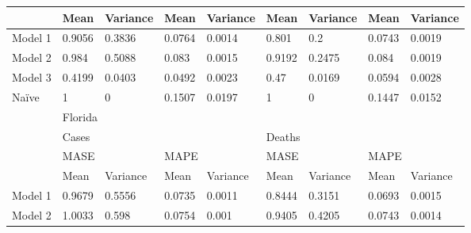 \begin{table}[h]
\begin{tabular}{|l|llll|llll|}
\cline{2-9}
        & \multicolumn{1}{l|}{Mean} & \multicolumn{1}{l|}{Variance} & \multicolumn{1}{l|}{Mean} & Variance & \multicolumn{1}{l|}{Mean} & \multicolumn{1}{l|}{Variance} & \multicolumn{1}{l|}{Mean} & Variance  \\ 
\hline
Model 1 & 0.9056                    & 0.3836                        & 0.0764                    & 0.0014   & 0.801                     & 0.2                           & 0.0743                    & 0.0019    \\
Model 2 & 0.984                     & 0.5088                        & 0.083                     & 0.0015   & 0.9192                    & 0.2475                        & 0.084                     & 0.0019    \\
Model 3 & 0.4199                    & 0.0403                        & 0.0492                    & 0.0023   & 0.47                      & 0.0169                        & 0.0594                    & 0.0028    \\
Na\"ive   & 1                         & 0                             & 0.1507                    & 0.0197   & 1                         & 0                             & 0.1447                    & 0.0152    \\ 
\hline
        & \multicolumn{8}{l|}{Florida}                                                                                                                                                                         \\ 
\cline{2-9}
        & \multicolumn{4}{l|}{Cases}                                                                       & \multicolumn{4}{l|}{Deaths}                                                                       \\ 
\cline{2-9}
        & \multicolumn{2}{l|}{MASE}                                 & \multicolumn{2}{l|}{MAPE}            & \multicolumn{2}{l|}{MASE}                                 & \multicolumn{2}{l|}{MAPE}             \\ 
\cline{2-9}
        & \multicolumn{1}{l|}{Mean} & \multicolumn{1}{l|}{Variance} & \multicolumn{1}{l|}{Mean} & Variance & \multicolumn{1}{l|}{Mean} & \multicolumn{1}{l|}{Variance} & \multicolumn{1}{l|}{Mean} & Variance  \\ 
\hline
Model 1 & 0.9679                    & 0.5556                        & 0.0735                    & 0.0011   & 0.8444                    & 0.3151                        & 0.0693                    & 0.0015    \\
Model 2 & 1.0033                    & 0.598                         & 0.0754                    & 0.001    & 0.9405                    & 0.4205                        & 0.0743                    & 0.0014    \\

\end{tabular}
\end{table}
